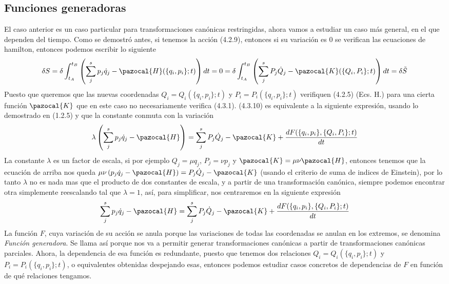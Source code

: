 \subsection{Funciones generadoras}
El caso anterior es un caso particular para transformaciones canónicas restringidas, ahora vamos a estudiar un caso más general, en el que dependen del tiempo. Como se demostró antes, si tenemos la acción (4.2.9), entonces si su variación es $0$ se verifican las ecuaciones de hamilton, entonces podemos escribir lo siguiente
\begin{equation} \label{4.2.7}
    \delta S = \delta\int_{t_A}^{t_B} \left(\sum_j^s p_j \dot{q}_j -\pazocal{H}(\{q_i,p_i\};t)\right) dt = 0 = \delta\int_{t_A}^{t_B} \left(\sum_j^s P_j \dot{Q}_j -\pazocal{K}(\{Q_i,P_i\};t)\right) dt = \delta \tilde{S}
\end{equation} 
Puesto que queremos que las nuevas coordenadas $Q_i=Q_i(\{q_i,p_i\};t)$ y $P_i=P_i(\{q_i,p_i\};t)$ verifiquen (4.2.5) (Ecs. H.) para una cierta función $\pazocal{K}$ que en este caso no necesariamente verifica (4.3.1). (4.3.10) es equivalente a la siguiente expresión, usando lo demostrado en (1.2.5) y que la constante conmuta con la variación
\begin{equation} \label{4.2.7}
    \lambda\left(\sum_j^s p_j \dot{q}_j -\pazocal{H}\right) = \sum_j^s P_j \dot{Q}_j -\pazocal{K} +  \frac{dF(\{q_i,p_i\},\{Q_i,P_i\};t)}{dt}
\end{equation} 
La constante $\lambda$ es un factor de escala, si por ejemplo $Q_j = \mu q_j$, $P_j = \nu p_j$ y $\pazocal{K} = \mu \nu \pazocal{H}$, entonces tenemos que la ecuación de arriba nos queda $\mu\nu\left(p_j \dot{q}_j -\pazocal{H}\right) = P_j \dot{Q}_j -\pazocal{K}$ (usando el criterio de suma de indices de Einstein), por lo tanto $\lambda$ no es nada mas que el producto de dos constantes de escala, y a partir de una transformación canónica, siempre podemos encontrar otra simplemente reescalando tal que $\lambda = 1$, así, para simplificar, nos centraremos en la siguiente expresión 
\begin{equation} \label{4.2.7}
    \sum_j^s p_j \dot{q}_j -\pazocal{H} = \sum_j^s P_j \dot{Q}_j -\pazocal{K} + \frac{dF(\{q_i,p_i\},\{Q_i,P_i\};t)}{dt}
\end{equation} 
La función $F$, cuya variación de su acción se anula porque las variaciones de todas las coordenadas se anulan en los extremos, se denomina \textit{Función generadora}. Se llama así porque nos va a permitir generar transformaciones canónicas a partir de transformaciones canónicas parciales.
Ahora, la dependencia de esa función es redundante, puesto que tenemos dos relaciones $Q_i=Q_i(\{q_i,p_i\};t)$ y $P_i=P_i(\{q_i,p_i\};t)$, o equivalentes obtenidas despejando esas, entonces podemos estudiar casos concretos de dependencias de $F$ en función de qué relaciones tengamos.

